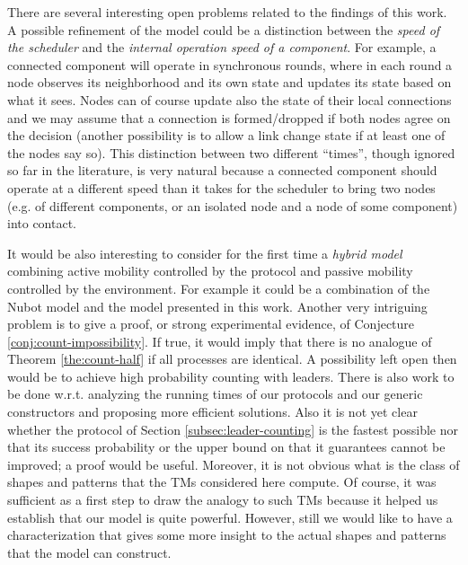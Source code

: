 \documentclass[oribibl, 11pt]{llncs}
\begin{document}
There are several interesting open problems related to the findings of this work. A possible refinement of the model could be a distinction between the \emph{speed of the scheduler} and the \emph{internal operation speed of a component}. For example, a connected component will operate in synchronous rounds, where in each round a node observes its neighborhood and its own state and updates its state based on what it sees. Nodes can of course update also the state of their local connections and we may assume that a connection is formed/dropped if both nodes agree on the decision (another possibility is to allow a link change state if at least one of the nodes say so). This distinction between two different ``times'', though ignored so far in the literature, is very natural because a connected component should operate at a different speed than it takes for the scheduler to bring two nodes (e.g. of different components, or an isolated node and a node of some component) into contact. 

It would be also interesting to consider for the first time a \emph{hybrid model} combining active mobility controlled by the protocol and passive mobility controlled by the environment. For example it could be a combination of the Nubot model and the model presented in this work. Another very intriguing problem is to give a proof, or strong experimental evidence, of Conjecture \ref{conj:count-impossibility}. If true, it would imply that there is no analogue of Theorem \ref{the:count-half} if all processes are identical. A possibility left open then would be to achieve high probability counting with  leaders. There is also work to be done w.r.t. analyzing the running times of our protocols and our generic constructors and proposing more efficient solutions. Also it is not yet clear whether the protocol of Section \ref{subsec:leader-counting} is the fastest possible nor that its success probability or the upper bound on  that it guarantees cannot be improved; a proof would be useful. Moreover, it is not obvious what is the class of shapes and patterns that the TMs considered here compute. Of course, it was sufficient as a first step to draw the analogy to such TMs because it helped us establish that our model is quite powerful. However, still we would like to have a characterization that gives some more insight to the actual shapes and patterns that the model can construct.
\end{document}
